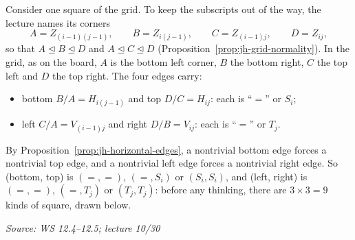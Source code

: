 \documentclass[11pt]{report}
\newcommand{\srcline}[1]{\par\hfill{\footnotesize\textit{Source: #1}}}
\begin{document}
\begin{rembox}\label{rem:jh-squares}
Consider one square of the grid. To keep the subscripts out of the way, the lecture names its corners
\[ A = Z_{(i-1)(j-1)}, \qquad B = Z_{i(j-1)}, \qquad C = Z_{(i-1)j}, \qquad D = Z_{ij}, \]
so that $A \trianglelefteq B \trianglelefteq D$ and $A \trianglelefteq C \trianglelefteq D$ (Proposition~\ref{prop:jh-grid-normality}). In the grid, as on the board, $A$ is the bottom left corner, $B$ the bottom right, $C$ the top left and $D$ the top right. The four edges carry:
\begin{itemize}[nosep]
    \item bottom $B/A = H_{i(j-1)}$ and top $D/C = H_{ij}$: each is ``$=$'' or $S_i$;
    \item left $C/A = V_{(i-1)j}$ and right $D/B = V_{ij}$: each is ``$=$'' or $T_j$.
\end{itemize}
By Proposition~\ref{prop:jh-horizontal-edges}, a nontrivial bottom edge forces a nontrivial top edge, and a nontrivial left edge forces a nontrivial right edge. So (bottom, top) is $(=, =)$, $(=, S_i)$ or $(S_i, S_i)$, and (left, right) is $(=, =)$, $(=, T_j)$ or $(T_j, T_j)$: before any thinking, there are $3 \times 3 = 9$ kinds of square, drawn below.
\srcline{WS 12.4--12.5; lecture 10/30}
\end{rembox}
\end{document}
